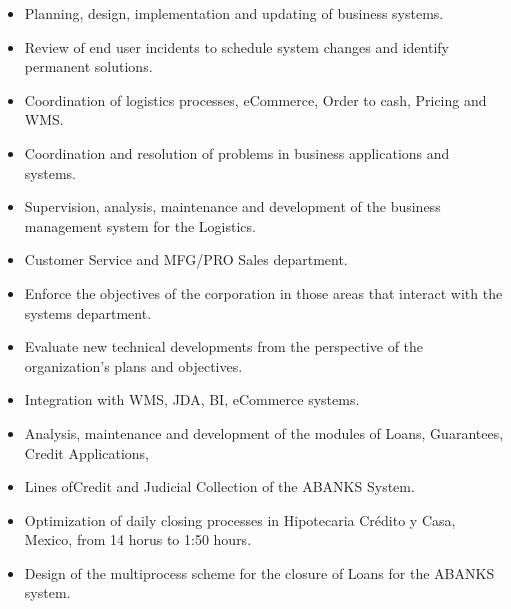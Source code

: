 \documentclass[10pt,a4paper,ragged2e,withhyper]{altacv}
\begin{document}
\begin{paracol}{2}

\begin{itemize}
\item Planning, design, implementation and updating of business systems.
\item Review of end user incidents to schedule system changes and identify permanent solutions.
\item Coordination of logistics processes, eCommerce, Order to cash, Pricing and WMS.
\item Coordination and resolution of problems in business applications and systems.

\end{itemize}

\divider

\begin{itemize}
\item Supervision, analysis, maintenance and development of the business management system for the Logistics.
\item Customer Service and MFG/PRO Sales department.
\item Enforce the objectives of the corporation in those areas that interact with the systems department.
\item Evaluate new technical developments from the perspective of the organization's plans and objectives.
\item Integration with WMS, JDA, BI, eCommerce systems.
\end{itemize}

\divider

\begin{itemize}
\item Analysis, maintenance and development of the modules of Loans, Guarantees, Credit Applications,
\item Lines ofCredit and Judicial Collection of the ABANKS System.
\item Optimization of daily closing processes in Hipotecaria Crédito y Casa, Mexico, from 14 horus to 1:50 hours.
\item Design of the multiprocess scheme for the closure of Loans for the ABANKS system.
\end{itemize}


\end{paracol}
\end{document}
